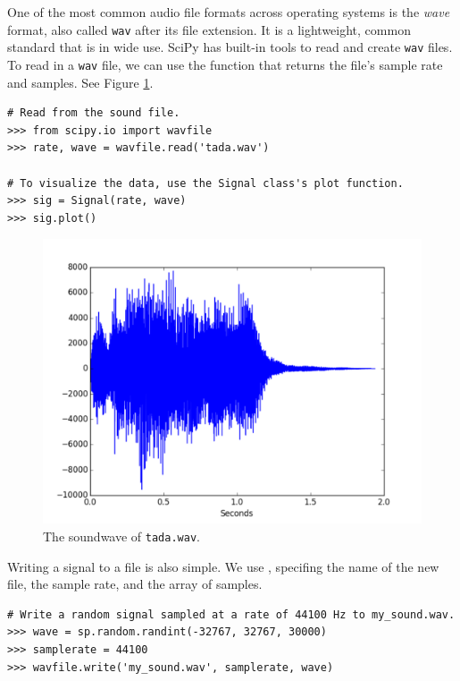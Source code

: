One of the most common audio file formats across operating systems is the \emph{wave} format, also called \texttt{wav} after its file extension.
It is a lightweight, common standard that is in wide use.
SciPy has built-in tools to read and create \texttt{wav} files.
To read in a \texttt{wav} file, we can use the  function that returns the file's sample rate and samples.
See Figure \ref{fig:tada_sig}.

\begin{lstlisting}
# Read from the sound file.
>>> from scipy.io import wavfile
>>> rate, wave = wavfile.read('tada.wav')

# To visualize the data, use the Signal class's plot function.
>>> sig = Signal(rate, wave)
>>> sig.plot()
\end{lstlisting}

\begin{figure}[ht]
\centering
\includegraphics[width=\textwidth]{figures/tada.pdf}
\caption{The soundwave of \texttt{tada.wav}.}
\label{fig:tada_sig}
\end{figure}

Writing a signal to a file is also simple.
We use , specifing the name of the new file, the sample rate, and the array of samples.

\begin{lstlisting}
# Write a random signal sampled at a rate of 44100 Hz to my_sound.wav.
>>> wave = sp.random.randint(-32767, 32767, 30000)
>>> samplerate = 44100
>>> wavfile.write('my_sound.wav', samplerate, wave)
\end{lstlisting}

